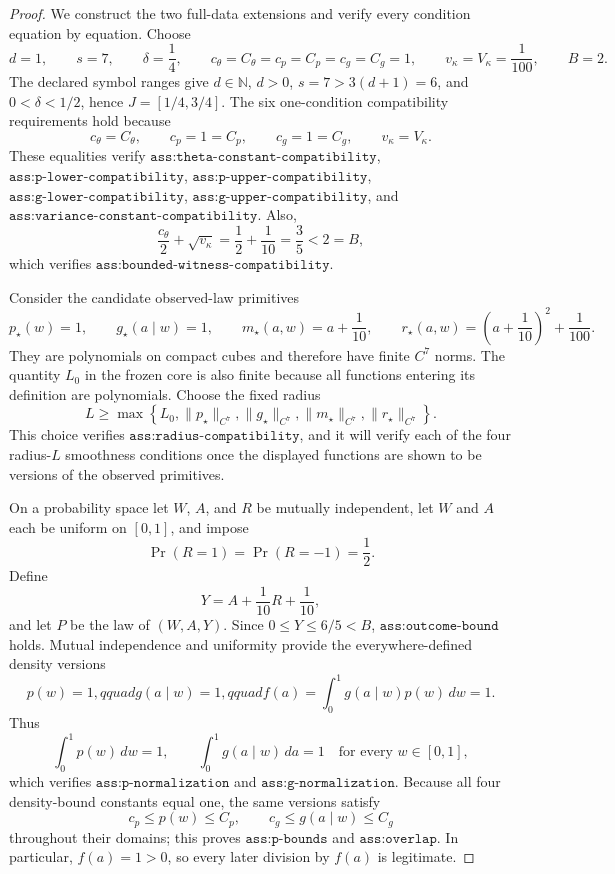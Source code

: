 \documentclass{article}
\begin{document}
\begin{proof}
We construct the two full-data extensions and verify every condition equation by equation.  Choose
\[
 d=1,\qquad s=7,\qquad \delta=\frac14,\qquad
 c_{\theta}=C_{\theta}=c_p=C_p=c_g=C_g=1,
 \qquad v_{\kappa}=V_{\kappa}=\frac1{100},\qquad B=2.
\]
The declared symbol ranges give \(d\in\mathbb N\), \(d>0\), \(s=7>3(d+1)=6\), and \(0<\delta<1/2\), hence \(J=[1/4,3/4]\).  The six one-condition compatibility requirements hold because
\[
 c_{\theta}=C_{\theta},\qquad c_p=1=C_p,\qquad
 c_g=1=C_g,\qquad v_{\kappa}=V_{\kappa}.
\]
These equalities verify \(\texttt{ass:theta-constant-compatibility}\), \(\texttt{ass:p-lower-compatibility}\), \(\texttt{ass:p-upper-compatibility}\), \(\texttt{ass:g-lower-compatibility}\), \(\texttt{ass:g-upper-compatibility}\), and \(\texttt{ass:variance-constant-compatibility}\).  Also,
\[
 \frac{c_{\theta}}2+\sqrt{v_{\kappa}}
 =\frac12+\frac1{10}=\frac35<2=B,
\]
which verifies \(\texttt{ass:bounded-witness-compatibility}\).

Consider the candidate observed-law primitives
\[
 p_\star(w)=1,\qquad g_\star(a\mid w)=1,\qquad
 m_\star(a,w)=a+\frac1{10},\qquad
 r_\star(a,w)=\left(a+\frac1{10}\right)^2+\frac1{100}.
\]
They are polynomials on compact cubes and therefore have finite \(C^7\) norms.  The quantity \(L_0\) in the frozen core is also finite because all functions entering its definition are polynomials.  Choose the fixed radius
\[
 L\ge \max\left\{L_0,\lVert p_\star\rVert_{C^7},
 \lVert g_\star\rVert_{C^7},\lVert m_\star\rVert_{C^7},
 \lVert r_\star\rVert_{C^7}\right\}.
\]
This choice verifies \(\texttt{ass:radius-compatibility}\), and it will verify each of the four radius-\(L\) smoothness conditions once the displayed functions are shown to be versions of the observed primitives.

On a probability space let \(W\), \(A\), and \(R\) be mutually independent, let \(W\) and \(A\) each be uniform on \([0,1]\), and impose
\[
 \Pr(R=1)=\Pr(R=-1)=\frac12.
\]
Define
\[
 Y=A+\frac1{10}R+\frac1{10},
\]
and let \(P\) be the law of \((W,A,Y)\).  Since \(0\le Y\le6/5<B\), \(\texttt{ass:outcome-bound}\) holds.  Mutual independence and uniformity provide the everywhere-defined density versions
\[
 p(w)=1,qquad g(a\mid w)=1,qquad
 f(a)=\int_0^1g(a\mid w)p(w)\,dw=1.
\]
Thus
\[
 \int_0^1p(w)\,dw=1,
 \qquad
 \int_0^1g(a\mid w)\,da=1\quad\text{for every }w\in[0,1],
\]
which verifies \(\texttt{ass:p-normalization}\) and \(\texttt{ass:g-normalization}\).  Because all four density-bound constants equal one, the same versions satisfy
\[
 c_p\le p(w)\le C_p,
 \qquad
 c_g\le g(a\mid w)\le C_g
\]
throughout their domains; this proves \(\texttt{ass:p-bounds}\) and \(\texttt{ass:overlap}\).  In particular, \(f(a)=1>0\), so every later division by \(f(a)\) is legitimate.


\end{proof}
\end{document}
